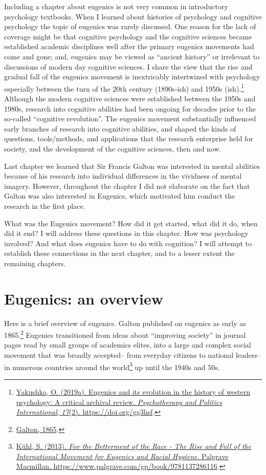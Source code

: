 \documentclass[
  oneside,
  12pt]{crumpbook}
\begin{document}
Including a chapter about eugenics is not very common in introductory psychology textbooks. When I learned about histories of psychology and cognitive psychology the topic of eugenics was rarely discussed. One reason for the lack of coverage might be that cognitive psychology and the cognitive sciences became established academic disciplines well after the primary eugenics movements had come and gone; and, eugenics may be viewed as ``ancient history'' or irrelevant to discussions of modern day cognitive sciences. I share the view that the rise and gradual fall of the eugenics movement is inextricably intertwined with psychology especially between the turn of the 20th century (1890s-ish) and 1950s (ish).\footnote{\protect\hyperlink{ref-yakushkoEugenicsItsEvolution2019}{Yakushko, O. (2019a). Eugenics and its evolution in the history of western psychology: {A} critical archival review. \emph{Psychotherapy and Politics International}, \emph{17}(2). \url{https://doi.org/gg3hsf}}.} Although the modern cognitive sciences were established between the 1950s and 1980s, research into cognitive abilities had been ongoing for decades prior to the so-called ``cognitive revolution''. The eugenics movement substantially influenced early branches of research into cognitive abilities, and shaped the kinds of questions, tools/methods, and applications that the research enterprise held for society, and the development of the cognitive sciences, then and now.

Last chapter we learned that Sir Francis Galton was interested in mental abilities because of his research into individual differences in the vividness of mental imagery. However, throughout the chapter I did not elaborate on the fact that Galton was also interested in Eugenics, which motivated him conduct the research in the first place.

What was the Eugenics movement? How did it get started, what did it do, when did it end? I will address these questions in this chapter. How was psychology involved? And what does eugenics have to do with cognition? I will attempt to establish these connections in the next chapter, and to a lesser extent the remaining chapters.

\hypertarget{eugenics-an-overview}{%
\section{Eugenics: an overview}\label{eugenics-an-overview}}

Here is a brief overview of eugenics. Galton published on eugenics as early as 1865.\footnote{\protect\hyperlink{ref-galtonHereditaryTalentCharacter1865}{Galton, 1865}.} Eugenics transitioned from ideas about ``improving society'' in journal pages read by small groups of academics elites, into a large and complex social movement that was broadly accepted-- from everyday citizens to national leaders-- in numerous countries around the world\footnote{\protect\hyperlink{ref-kuhlBettermentRaceRise2013}{Kühl, S. (2013). \emph{For the {Betterment} of the {Race} - {The Rise} and {Fall} of the {International Movement} for {Eugenics} and {Racial Hygiene}}. {Palgrave Macmillan}. \url{https://www.palgrave.com/gp/book/9781137286116}}.} up until the 1940s and 50s.
\end{document}
